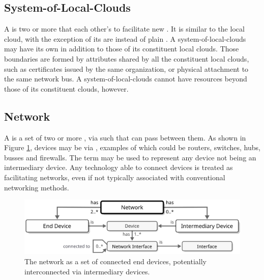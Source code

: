 \subsection{System-of-Local-Clouds}
\label{sec:concepts:solc}

A  is two or more  that  each other's  to facilitate new .
It is similar to the local cloud, with the exception of its  are  instead of plain .
A system-of-local-clouds may have its own  in addition to those of its constituent local clouds.
Those boundaries are formed by attributes shared by all the constituent local clouds, such as certificates issued by the same organization, or physical attachment to the same network bus.
A system-of-local-clouds cannot have resources beyond those of its constituent clouds, however.

\subsection{Network}
\label{sec:concepts:network}

A  is a set of two or more ,  via  such that  can pass between them.
As shown in Figure \ref{fig:network}, devices may be  via , examples of which could be routers, switches, hubs, busses and firewalls.
The term  may be used to represent any device not being an intermediary device.
Any technology able to connect devices is treated as facilitating networks, even if not typically associated with conventional networking methods.

\vfill

\begin{figure}[ht!]
  \centering
  \includegraphics[scale=0.9]{figures/network}
  \caption{
    The network as a set of connected end devices, potentially interconnected via intermediary devices.
  }
  \label{fig:network}
\end{figure}

